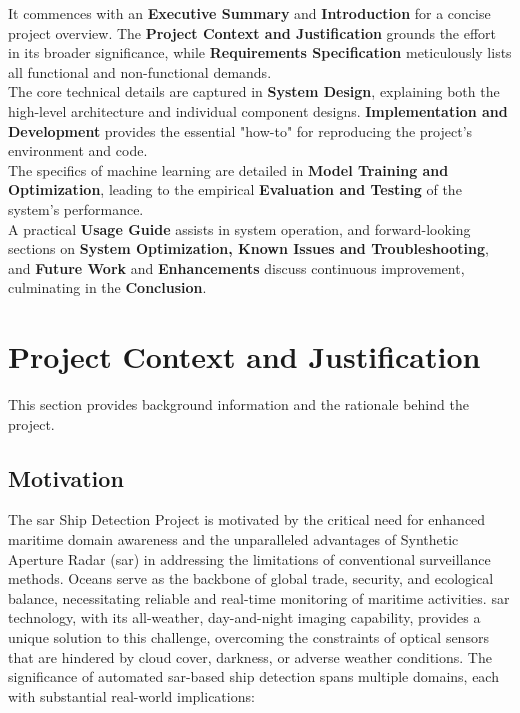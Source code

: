 \documentclass{article}
\begin{document}
It commences with an \textbf{Executive Summary} and \textbf{Introduction }for a concise project overview. The \textbf{Project Context and Justification} grounds the effort in its broader significance, while \textbf{Requirements Specification} meticulously lists all functional and non-functional demands. \\

The core technical details are captured in \textbf{System Design}, explaining both the high-level architecture and individual component designs. \textbf{Implementation and Development} provides the essential "how-to" for reproducing the project's environment and code. \\

The specifics of machine learning are detailed in \textbf{Model Training and Optimization}, leading to the empirical \textbf{Evaluation and Testing} of the system's performance. \\

A practical \textbf{Usage Guide} assists in system operation, and forward-looking sections on \textbf{System Optimization, Known Issues and Troubleshooting}, and \textbf{Future Work} and \textbf{Enhancements} discuss continuous improvement, culminating in the \textbf{Conclusion}. \newpage 

\section{Project Context and Justification}
This section provides background information and the rationale behind the project. \subsection{Motivation}
The \acrshort{sar} Ship Detection Project is motivated by the critical need for enhanced maritime domain awareness and the unparalleled advantages of Synthetic Aperture Radar (\acrshort{sar}) in addressing the limitations of conventional surveillance methods. Oceans serve as the backbone of global trade, security, and ecological balance, necessitating reliable and real-time monitoring of maritime activities. \acrshort{sar} technology, with its all-weather, day-and-night imaging capability, provides a unique solution to this challenge, overcoming the constraints of optical sensors that are hindered by cloud cover, darkness, or adverse weather conditions. The significance of automated \acrshort{sar}-based ship detection spans multiple domains, each with substantial real-world implications:
\end{document}
